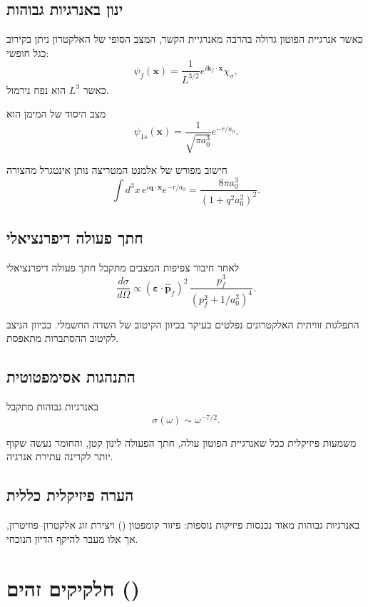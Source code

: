 \subsection{ינון באנרגיות גבוהות}

כאשר אנרגיית הפוטון גדולה בהרבה מאנרגיית הקשר,
המצב הסופי של האלקטרון ניתן בקירוב כגל חופשי:
\[
\psi_f(\mathbf{x})
=
\frac{1}{L^{3/2}}
e^{i\mathbf{k}_f\cdot\mathbf{x}}
\chi_\sigma,
\]
כאשר $L^3$ הוא נפח נירמול.

מצב היסוד של המימן הוא
\[
\psi_{1s}(\mathbf{x})
=
\frac{1}{\sqrt{\pi a_0^3}}
e^{-r/a_0}.
\]

חישוב מפורש של אלמנט המטריצה נותן אינטגרל מהצורה
\[
\int d^3x\,
e^{i\mathbf{q}\cdot\mathbf{x}}
e^{-r/a_0}
=
\frac{8\pi a_0^3}{(1+q^2a_0^2)^2}.
\]

\subsection{חתך פעולה דיפרנציאלי}

לאחר חיבור צפיפות המצבים מתקבל חתך פעולה דיפרנציאלי
\[
\frac{d\sigma}{d\Omega}
\propto
(\boldsymbol{\varepsilon}\cdot\hat{\mathbf{p}}_f)^2
\,
\frac{p_f^3}{(p_f^2 + 1/a_0^2)^4}.
\]

\begin{notebox}{התפלגות זוויתית}
האלקטרונים נפלטים בעיקר בכיוון הקיטוב של השדה החשמלי.
בכיוון הניצב לקיטוב ההסתברות מתאפסת.
\end{notebox}

\subsection{התנהגות אסימפטוטית}

באנרגיות גבוהות מתקבל
\[
\sigma(\omega)\sim \omega^{-7/2}.
\]

\begin{resultbox}{משמעות פיזיקלית}
ככל שאנרגיית הפוטון עולה,
חתך הפעולה לינון קטן,
והחומר נעשה שקוף יותר לקרינה עתירת אנרגיה.
\end{resultbox}

\subsection{הערה פיזיקלית כללית}

באנרגיות גבוהות מאוד נכנסות פיזיקות נוספות:
פיזור קומפטון ()
ויצירת זוג אלקטרון–פוזיטרון,
אך אלו מעבר להיקף הדיון הנוכחי.

\section{חלקיקים זהים ()}

